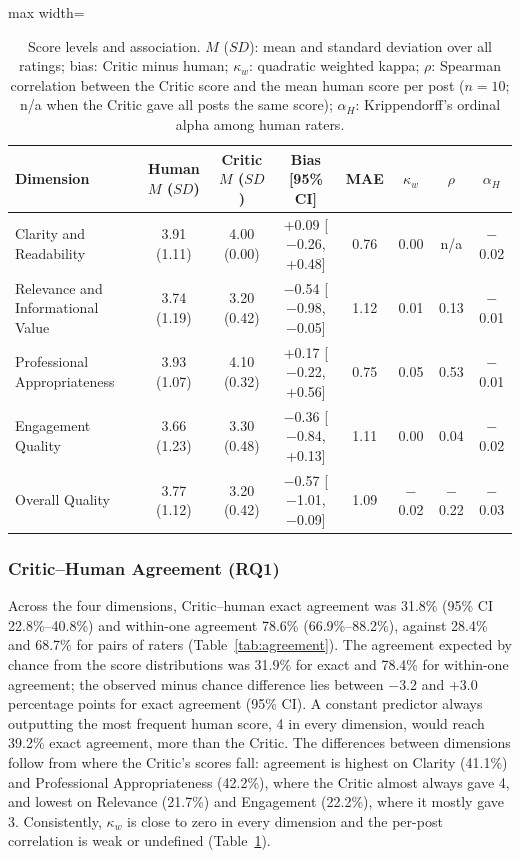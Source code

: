 \documentclass[a4paper,twoside]{article}
\newcommand{\HHexAll}{28.4\%}
\newcommand{\HHwAll}{68.7\%}
\newcommand{\CHexAll}{31.8\%}
\newcommand{\CHwAll}{78.6\%}
\newcommand{\CHchanceExAll}{31.9\%}
\newcommand{\CHchanceWAll}{78.4\%}
\newcommand{\ConstExAll}{39.2\%}
\newcommand{\CHexLo}{22.8\%}
\newcommand{\CHexHi}{40.8\%}
\newcommand{\CHwLo}{66.9\%}
\newcommand{\CHwHi}{88.2\%}
\newcommand{\ChanceDiffExLo}{$-$3.2}
\newcommand{\ChanceDiffExHi}{+3.0}
\newcommand{\CHexCla}{41.1\%}
\newcommand{\CHexRel}{21.7\%}
\newcommand{\CHexPro}{42.2\%}
\newcommand{\CHexEng}{22.2\%}
\begin{document}
\begin{table}[t]
\centering
\caption{Score levels and association. $M$ ($SD$): mean and standard deviation over all ratings; bias: Critic minus human; $\kappa_w$: quadratic weighted kappa; $\rho$: Spearman correlation between the Critic score and the mean human score per post ($n=10$; n/a when the Critic gave all posts the same score); $\alpha_H$: Krippendorff's ordinal alpha among human raters.}
\label{tab:scores}
\small
\begin{adjustbox}{max width=\textwidth}
\begin{tabular}{lccccccc}
\toprule
Dimension & Human $M$ ($SD$) & Critic $M$ ($SD$) & Bias [95\% CI] & MAE & $\kappa_w$ & $\rho$ & $\alpha_H$ \\
\midrule
Clarity and Readability & 3.91 (1.11) & 4.00 (0.00) & +0.09 [$-$0.26, +0.48] & 0.76 & 0.00 & n/a & $-$0.02 \\
Relevance and Informational Value & 3.74 (1.19) & 3.20 (0.42) & $-$0.54 [$-$0.98, $-$0.05] & 1.12 & 0.01 & 0.13 & $-$0.01 \\
Professional Appropriateness & 3.93 (1.07) & 4.10 (0.32) & +0.17 [$-$0.22, +0.56] & 0.75 & 0.05 & 0.53 & $-$0.01 \\
Engagement Quality & 3.66 (1.23) & 3.30 (0.48) & $-$0.36 [$-$0.84, +0.13] & 1.11 & 0.00 & 0.04 & $-$0.02 \\
\midrule
Overall Quality & 3.77 (1.12) & 3.20 (0.42) & $-$0.57 [$-$1.01, $-$0.09] & 1.09 & $-$0.02 & $-$0.22 & $-$0.03 \\
\bottomrule
\end{tabular}
\end{adjustbox}
\end{table}

\subsubsection{Critic--Human Agreement (RQ1)}

Across the four dimensions, Critic--human exact agreement was \CHexAll{} (95\% CI \CHexLo{}--\CHexHi{}) and within-one agreement \CHwAll{} (\CHwLo{}--\CHwHi{}), against \HHexAll{} and \HHwAll{} for pairs of raters (Table~\ref{tab:agreement}). The agreement expected by chance from the score distributions was \CHchanceExAll{} for exact and \CHchanceWAll{} for within-one agreement; the observed minus chance difference lies between \ChanceDiffExLo{} and \ChanceDiffExHi{} percentage points for exact agreement (95\% CI). A constant predictor always outputting the most frequent human score, 4 in every dimension, would reach \ConstExAll{} exact agreement, more than the Critic. The differences between dimensions follow from where the Critic's scores fall: agreement is highest on Clarity (\CHexCla{}) and Professional Appropriateness (\CHexPro{}), where the Critic almost always gave 4, and lowest on Relevance (\CHexRel{}) and Engagement (\CHexEng{}), where it mostly gave 3. Consistently, $\kappa_w$ is close to zero in every dimension and the per-post correlation is weak or undefined (Table~\ref{tab:scores}).
\end{document}
